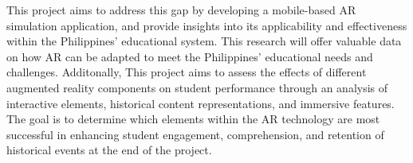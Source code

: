 This project aims to address this gap by developing a mobile-based AR simulation application, and provide insights into its applicability and effectiveness within the Philippines' educational system. This research will offer valuable data on how AR can be adapted to meet the Philippines' educational needs and challenges. Additonally, This project aims to assess the effects of different augmented reality components on student performance through an analysis of interactive elements, historical content representations, and immersive features. The goal is to determine which elements within the AR technology are most successful in enhancing student engagement,  comprehension, and retention of historical events at the end of the project.

